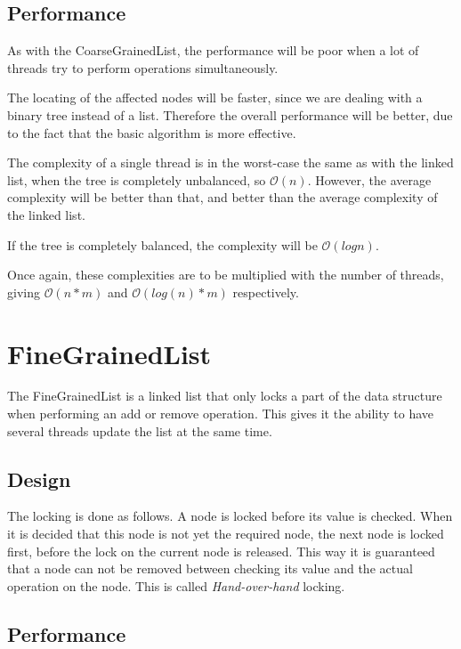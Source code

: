 \documentclass[a4paper]{article}
\def\bigoh{\mathcal{O}}
\begin{document}
\subsection{Performance}

As with the CoarseGrainedList, the performance will be poor when a lot of
threads try to perform operations simultaneously.

The locating of the affected nodes will be faster, since we are dealing
with a binary tree instead of a list. Therefore the overall performance
will be better, due to the fact that the basic algorithm is more effective.

The complexity of a single thread is in the worst-case the same as with the
linked list, when the tree is completely unbalanced, so $\bigoh(n)$.
However, the average complexity will be better than that, and better than the
average complexity of the linked list.

If the tree is completely balanced, the complexity will be
$\bigoh(log n)$.

Once again, these complexities are to be multiplied with the number of
threads, giving $\bigoh(n * m)$ and $\bigoh(log(n) * m)$
respectively.

\section{FineGrainedList}

The FineGrainedList is a linked list that only locks a part of
the data structure when performing an add or remove operation. This
gives it the ability to have several threads update the list at the
same time.

\subsection{Design}

The locking is done as follows. A node is locked before its value is checked.
When it is decided that this node is not yet the required node, the next node
is locked first, before the lock on the current node is released. This way
it is guaranteed that a node can not be removed between checking its value and
the actual operation on the node. This is called \emph{Hand-over-hand} locking.

\subsection{Performance}
\end{document}

